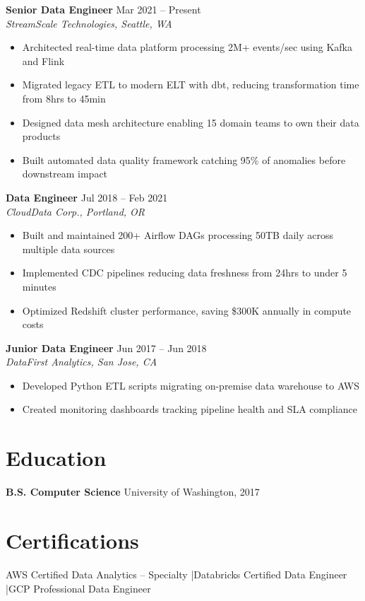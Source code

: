 \documentclass[11pt,a4paper]{article}
\begin{document}
\noindent\textbf{Senior Data Engineer} \hfill \textcolor{accent}{Mar 2021 -- Present}\\
\textit{StreamScale Technologies, Seattle, WA}
\begin{itemize}[leftmargin=1.2em,nosep,label=\textcolor{accent}{\texttt{|>}}]
\item Architected real-time data platform processing 2M+ events/sec using Kafka and Flink
\item Migrated legacy ETL to modern ELT with dbt, reducing transformation time from 8hrs to 45min
\item Designed data mesh architecture enabling 15 domain teams to own their data products
\item Built automated data quality framework catching 95\% of anomalies before downstream impact
\end{itemize}
\vspace{0.5em}

\noindent\textbf{Data Engineer} \hfill \textcolor{accent}{Jul 2018 -- Feb 2021}\\
\textit{CloudData Corp., Portland, OR}
\begin{itemize}[leftmargin=1.2em,nosep,label=\textcolor{accent}{\texttt{|>}}]
\item Built and maintained 200+ Airflow DAGs processing 50TB daily across multiple data sources
\item Implemented CDC pipelines reducing data freshness from 24hrs to under 5 minutes
\item Optimized Redshift cluster performance, saving \$300K annually in compute costs
\end{itemize}
\vspace{0.5em}

\noindent\textbf{Junior Data Engineer} \hfill \textcolor{accent}{Jun 2017 -- Jun 2018}\\
\textit{DataFirst Analytics, San Jose, CA}
\begin{itemize}[leftmargin=1.2em,nosep,label=\textcolor{accent}{\texttt{|>}}]
\item Developed Python ETL scripts migrating on-premise data warehouse to AWS
\item Created monitoring dashboards tracking pipeline health and SLA compliance
\end{itemize}

\section{Education}
\noindent\textbf{B.S. Computer Science} \hfill University of Washington, 2017

\section{Certifications}
\noindent AWS Certified Data Analytics -- Specialty \quad\textcolor{accent}{|}\quad Databricks Certified Data Engineer \quad\textcolor{accent}{|}\quad GCP Professional Data Engineer
\end{document}
